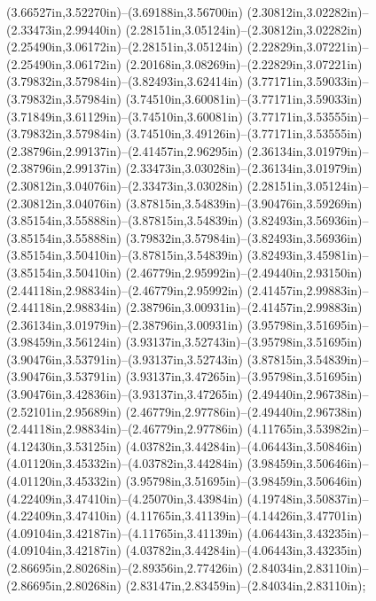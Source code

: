 (3.66527in,3.52270in)--(3.69188in,3.56700in) (2.30812in,3.02282in)--(2.33473in,2.99440in) (2.28151in,3.05124in)--(2.30812in,3.02282in) (2.25490in,3.06172in)--(2.28151in,3.05124in) (2.22829in,3.07221in)--(2.25490in,3.06172in) (2.20168in,3.08269in)--(2.22829in,3.07221in) (3.79832in,3.57984in)--(3.82493in,3.62414in) (3.77171in,3.59033in)--(3.79832in,3.57984in) (3.74510in,3.60081in)--(3.77171in,3.59033in) (3.71849in,3.61129in)--(3.74510in,3.60081in) (3.77171in,3.53555in)--(3.79832in,3.57984in) (3.74510in,3.49126in)--(3.77171in,3.53555in) (2.38796in,2.99137in)--(2.41457in,2.96295in) (2.36134in,3.01979in)--(2.38796in,2.99137in) (2.33473in,3.03028in)--(2.36134in,3.01979in) (2.30812in,3.04076in)--(2.33473in,3.03028in) (2.28151in,3.05124in)--(2.30812in,3.04076in) (3.87815in,3.54839in)--(3.90476in,3.59269in) (3.85154in,3.55888in)--(3.87815in,3.54839in) (3.82493in,3.56936in)--(3.85154in,3.55888in) (3.79832in,3.57984in)--(3.82493in,3.56936in) (3.85154in,3.50410in)--(3.87815in,3.54839in) (3.82493in,3.45981in)--(3.85154in,3.50410in) (2.46779in,2.95992in)--(2.49440in,2.93150in) (2.44118in,2.98834in)--(2.46779in,2.95992in) (2.41457in,2.99883in)--(2.44118in,2.98834in) (2.38796in,3.00931in)--(2.41457in,2.99883in) (2.36134in,3.01979in)--(2.38796in,3.00931in) (3.95798in,3.51695in)--(3.98459in,3.56124in) (3.93137in,3.52743in)--(3.95798in,3.51695in) (3.90476in,3.53791in)--(3.93137in,3.52743in) (3.87815in,3.54839in)--(3.90476in,3.53791in) (3.93137in,3.47265in)--(3.95798in,3.51695in) (3.90476in,3.42836in)--(3.93137in,3.47265in) (2.49440in,2.96738in)--(2.52101in,2.95689in) (2.46779in,2.97786in)--(2.49440in,2.96738in) (2.44118in,2.98834in)--(2.46779in,2.97786in) (4.11765in,3.53982in)--(4.12430in,3.53125in) (4.03782in,3.44284in)--(4.06443in,3.50846in) (4.01120in,3.45332in)--(4.03782in,3.44284in) (3.98459in,3.50646in)--(4.01120in,3.45332in) (3.95798in,3.51695in)--(3.98459in,3.50646in) (4.22409in,3.47410in)--(4.25070in,3.43984in) (4.19748in,3.50837in)--(4.22409in,3.47410in) (4.11765in,3.41139in)--(4.14426in,3.47701in) (4.09104in,3.42187in)--(4.11765in,3.41139in) (4.06443in,3.43235in)--(4.09104in,3.42187in) (4.03782in,3.44284in)--(4.06443in,3.43235in) (2.86695in,2.80268in)--(2.89356in,2.77426in) (2.84034in,2.83110in)--(2.86695in,2.80268in) (2.83147in,2.83459in)--(2.84034in,2.83110in);
